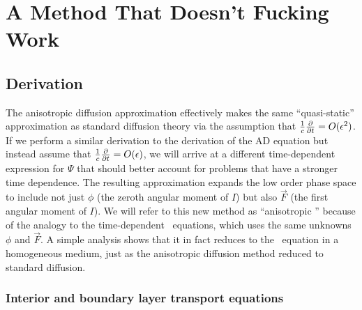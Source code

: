 
\chapter{A Method That Doesn't Fucking Work}\label{chap:aponeDerivation}

\section{Derivation}

The anisotropic diffusion approximation effectively makes the same
``quasi-static'' approximation as standard diffusion theory via the assumption
that
$\frac1c\frac{\partial }{\partial t}=O(\epsilon^2)$. If we perform a similar derivation to the
derivation of the AD equation but instead assume that
$\frac1c\frac{\partial }{\partial t}=O(\epsilon)$, we will
arrive at a different time-dependent expression for $\Psi$ that
should better account for problems that have a stronger time dependence.
The resulting approximation expands the low order phase
space to include not just $\phi$ (the zeroth angular moment of $I$) but also
$\vec{F}$ (the first angular moment of $I$). We will refer to this new method
as ``anisotropic \Pone'' because of the analogy to the time-dependent \Pone\
equations, which uses the same unknowns $\phi$ and $\vec{F}$. A simple analysis
shows that it in fact reduces to the \Pone\ equation in a homogeneous medium,
just as the anisotropic diffusion method reduced to standard diffusion.

\subsection{Interior and boundary layer transport equations}

